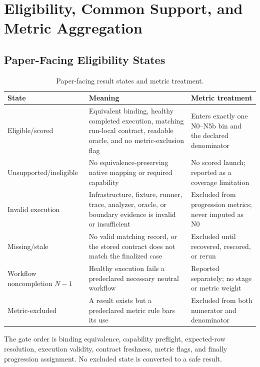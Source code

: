 \documentclass[letterpaper]{article}
\begin{document}
\section{Eligibility, Common Support, and Metric Aggregation}
\label{app:metrics}

\subsection{Paper-Facing Eligibility States}
\label{app:eligibility}

\begin{table}[t]
\centering
\small
\setlength{\tabcolsep}{4pt}
\renewcommand{\arraystretch}{1.12}
\begin{tabularx}{\textwidth}{@{}p{}X p{}@{}}
\toprule
State & Meaning & Metric treatment \\
\midrule
Eligible/scored & Equivalent binding, healthy completed execution, matching
run-local contract, readable oracle, and no metric-exclusion flag &
Enters exactly one N0--N5b bin and the declared denominator \\
Unsupported/ineligible & No equivalence-preserving native mapping or required
capability & No scored launch; reported as a coverage limitation \\
Invalid execution & Infrastructure, fixture, runner, trace, analyzer, oracle,
or boundary evidence is invalid or insufficient & Excluded from progression
metrics; never imputed as N0 \\
Missing/stale & No valid matching record, or the stored contract does not
match the finalized case & Excluded until recovered, rescored, or rerun \\
Workflow noncompletion \(N{-}1\) & Healthy execution fails a predeclared
necessary neutral workflow & Reported separately; no stage or metric weight \\
Metric-excluded & A result exists but a predeclared metric rule bars its use &
Excluded from both numerator and denominator \\
\bottomrule
\end{tabularx}
\caption{Paper-facing result states and metric treatment.}
\label{tab:eligibility-states}
\end{table}

The gate order is binding equivalence, capability preflight, expected-row
resolution, execution validity, contract freshness, metric flags, and finally
progression assignment.  No excluded state is converted to a safe result.
\end{document}
